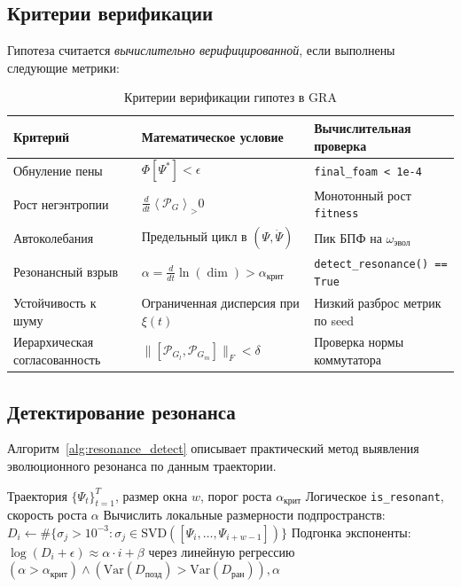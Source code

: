 \documentclass[11pt,a4paper]{article}
\theoremstyle{plain}
\theoremstyle{definition}
\theoremstyle{remark}
\newcommand{\Foam}{\Phi}
\newcommand{\Projector}{\mathcal{P}}
\newcommand{\expect}[2]{\left\langle#1\right\rangle_{#2}}
\begin{document}
\subsection{Критерии верификации}

Гипотеза считается \textit{вычислительно верифицированной}, если выполнены следующие метрики:

\begin{table}[H]
\centering
\caption{Критерии верификации гипотез в GRA}
\label{tab:criteria}
\renewcommand{\arraystretch}{1.3}
\begin{tabular}{p{3.5cm}p{5cm}p{4cm}}
\toprule
\textbf{Критерий} & \textbf{Математическое условие} & \textbf{Вычислительная проверка} \\
\midrule
Обнуление пены & $\Foam[\Psi^*] < \epsilon$ & \texttt{final\_foam < 1e-4} \\
Рост негэнтропии & $\frac{d}{dt}\expect{\Projector_G} > 0$ & Монотонный рост \texttt{fitness} \\
Автоколебания & Предельный цикл в $(\Psi,\dot{\Psi})$ & Пик БПФ на $\omega_{\text{эвол}}$ \\
Резонансный взрыв & $\alpha = \frac{d}{dt}\ln(\dim) > \alpha_{\text{крит}}$ & \texttt{detect\_resonance() == True} \\
Устойчивость к шуму & Ограниченная дисперсия при $\xi(t)$ & Низкий разброс метрик по seed \\
Иерархическая согласованность & $\|[\Projector_{G_l}, \Projector_{G_m}]\|_F < \delta$ & Проверка нормы коммутатора \\
\bottomrule
\end{tabular}
\end{table}

\subsection{Детектирование резонанса}

Алгоритм~\ref{alg:resonance_detect} описывает практический метод выявления эволюционного резонанса по данным траектории.

\begin{algorithm}[H]
\caption{Детектирование резонанса через рост размерности подпространства}
\label{alg:resonance_detect}
\begin{algorithmic}[1]
\Require Траектория $\{\Psi_t\}_{t=1}^T$, размер окна $w$, порог роста $\alpha_{\text{крит}}$
\Ensure Логическое \texttt{is\_resonant}, скорость роста $\alpha$
\State Вычислить локальные размерности подпространств:
    \State $D_i \gets \#\{\sigma_j > 10^{-3} : \sigma_j \in \text{SVD}([\Psi_i, \dots, \Psi_{i+w-1}])\}$
\EndFor
\State Подгонка экспоненты: $\log(D_i + \epsilon) \approx \alpha \cdot i + \beta$ через линейную регрессию
\State \Return $(\alpha > \alpha_{\text{крит}}) \land (\text{Var}(D_{\text{позд}}) > \text{Var}(D_{\text{ран}})), \alpha$
\end{algorithmic}
\end{algorithm}
\end{document}

